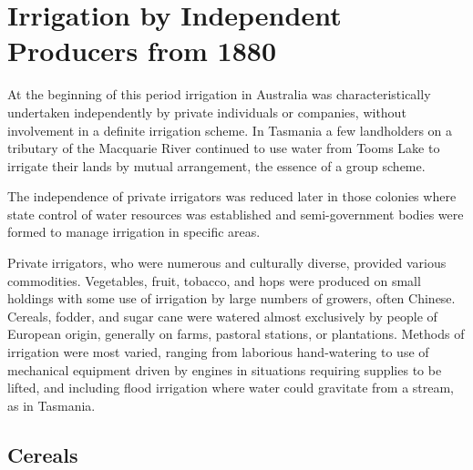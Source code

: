  
\chapter{Irrigation by Independent Producers from 1880}

\label{ch:indep}

\setcounter{endnote}{0}

At the beginning of this period irrigation in Australia was
characteristically undertaken independently by private individuals or
companies, without involvement in a definite irrigation scheme.  In
Tasmania a few landholders on a tributary of the Macquarie River
continued to use water from Tooms Lake to irrigate their lands by
mutual arrangement, the essence of a group scheme.

The independence of private irrigators was reduced later in those
colonies where state control of water resources was established and
semi-government bodies were formed to manage irrigation in specific
areas.

Private irrigators, who were numerous and culturally diverse, provided
various commodities.  Vegetables, fruit, tobacco, and hops were
produced on small holdings with some use of irrigation by large
numbers of growers, often Chinese.  Cereals, fodder,
and sugar cane were watered almost exclusively by people of
European origin, generally on farms, pastoral
stations, or plantations.  Methods of irrigation were most varied,
ranging from laborious hand-watering to use of mechanical equipment
driven by engines in situations requiring supplies to be lifted, and
including flood irrigation where water could gravitate from a stream,
as in Tasmania.

\section*{Cereals}

